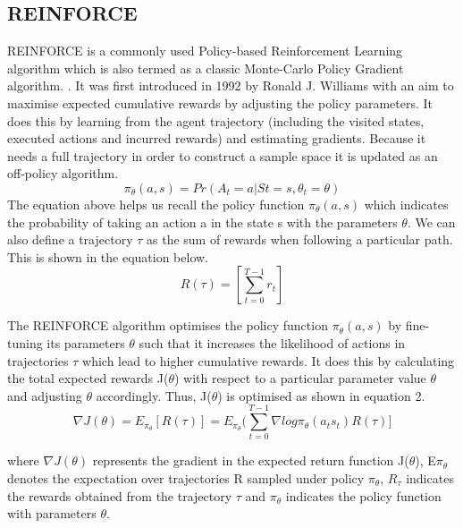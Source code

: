 \documentclass{article}
\begin{document}
\subsection{REINFORCE}
\par REINFORCE is a commonly used Policy-based Reinforcement Learning algorithm which is also termed as a classic Monte-Carlo Policy Gradient algorithm. \cite{sutton-barlo}. It was first introduced in 1992 by Ronald J. Williams with an aim to maximise expected cumulative rewards by adjusting the policy parameters. It does this by learning from the agent trajectory (including the visited states, executed actions and incurred rewards) and estimating gradients. Because it needs a full trajectory in order to construct a sample space it is updated as an off-policy algorithm. 
\begin{equation}
\pi_\theta(a, s) = Pr(A_t = a | St = s, \theta_t = \theta)
\end{equation}
The equation above helps us recall the policy function $\pi_{\theta}(a, s)$ which indicates the probability of taking an action a in the state s with the parameters $\theta$.
We can also define a trajectory $\tau$ as the sum of rewards when following a particular path. This is shown in the equation below.
\begin{equation}
R(\tau) = [\sum_{t=0}^{T-1}r_t] 
\end{equation}

\par The REINFORCE algorithm optimises the policy function $\pi_{\theta}(a,s)$ by fine-tuning its parameters $\theta$ such that it increases the likelihood of actions in trajectories $\tau$ which lead to higher cumulative rewards. It does this by calculating the total expected rewards J($\theta$) with respect to a particular parameter value $\theta$ and adjusting $\theta$ accordingly. Thus, J($\theta$) is optimised as shown in equation 2.
\begin{equation}
\nabla J(\theta) = E_{\pi_\theta}[ R(\tau)] =   E_{\pi_\theta} (\sum_{t=0}^{T-1} \nabla log\pi_\theta(a_t s_t) R(\tau)]
\end{equation}

where $\nabla J(\theta)$ represents the gradient in the expected return function J($\theta$), E$\pi_\theta$ denotes the expectation over trajectories R sampled under policy $\pi_\theta$, $R_{\tau}$ indicates the rewards obtained from the trajectory $\tau$ and $\pi_\theta$ indicates the policy function with parameters $\theta$.  \newline
\end{document}
